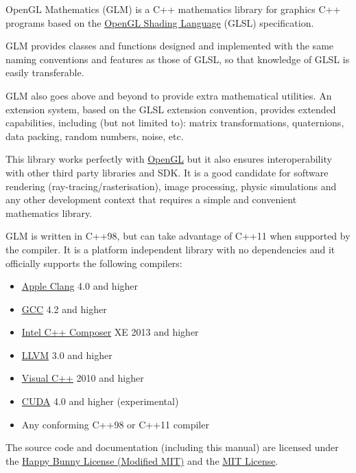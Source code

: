 \documentclass{scrartcl}
\numberwithin{figure}{subsection}
\begin{document}
OpenGL Mathematics (GLM) is a C++ mathematics library for graphics C++ programs based on the \href{http://www.opengl.org/registry/}{OpenGL Shading Language} (GLSL) specification.

GLM provides classes and functions designed and implemented with the same naming conventions and features as those of GLSL, so that knowledge of GLSL is easily transferable.

GLM also goes above and beyond to provide extra mathematical utilities.  An extension system, based on the GLSL extension convention, provides extended capabilities, including (but not limited to): matrix transformations, quaternions, data packing, random numbers, noise, etc.

This library works perfectly with \href{http://www.opengl.org}{OpenGL} but it also ensures interoperability with other third party libraries and SDK. It is a good candidate for software rendering (ray-tracing/rasterisation), image processing, physic simulations and any other development context that requires a simple and convenient mathematics library.

GLM is written in C++98, but can take advantage of C++11 when supported by the compiler. It is a platform independent library with no dependencies and it officially supports the following compilers:

\begin{itemize}
  \item \href{https://developer.apple.com/Library/mac/documentation/CompilerTools/Conceptual/LLVMCompilerOverview/index.html}{Apple Clang} 4.0 and higher
  \item \href{http://gcc.gnu.org/}{GCC} 4.2 and higher
  \item \href{https://software.intel.com/en-us/intel-compilers}{Intel C++ Composer} XE 2013 and higher
  \item \href{http://llvm.org/}{LLVM} 3.0 and higher
  \item \href{http://www.visualstudio.com/}{Visual C++} 2010 and higher
  \item \href{https://developer.nvidia.com/about-cuda}{CUDA} 4.0 and higher (experimental)
  \item Any conforming C++98 or C++11 compiler
\end{itemize}

The source code and documentation (including this manual) are licensed under the \hyperlink{happybunny}{Happy Bunny License (Modified MIT)} and the \hyperlink{mit}{MIT License}.
\end{document}
